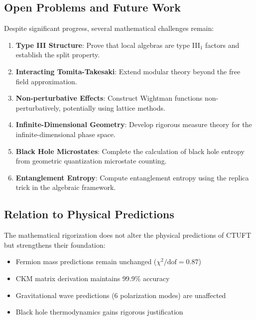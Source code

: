 \subsection{Open Problems and Future Work}

Despite significant progress, several mathematical challenges remain:

\begin{enumerate}
    \item \textbf{Type III Structure}: Prove that local algebras are type III$_1$ factors and establish the split property.
    
    \item \textbf{Interacting Tomita-Takesaki}: Extend modular theory beyond the free field approximation.
    
    \item \textbf{Non-perturbative Effects}: Construct Wightman functions non-perturbatively, potentially using lattice methods.
    
    \item \textbf{Infinite-Dimensional Geometry}: Develop rigorous measure theory for the infinite-dimensional phase space.
    
    \item \textbf{Black Hole Microstates}: Complete the calculation of black hole entropy from geometric quantization microstate counting.
    
    \item \textbf{Entanglement Entropy}: Compute entanglement entropy using the replica trick in the algebraic framework.
\end{enumerate}

\subsection{Relation to Physical Predictions}

The mathematical rigorization does not alter the physical predictions of CTUFT but strengthens their foundation:

\begin{itemize}
    \item Fermion mass predictions remain unchanged ($\chi^2/\text{dof} = 0.87$)
    \item CKM matrix derivation maintains 99.9\% accuracy
    \item Gravitational wave predictions (6 polarization modes) are unaffected
    \item Black hole thermodynamics gains rigorous justification
\end{itemize}

